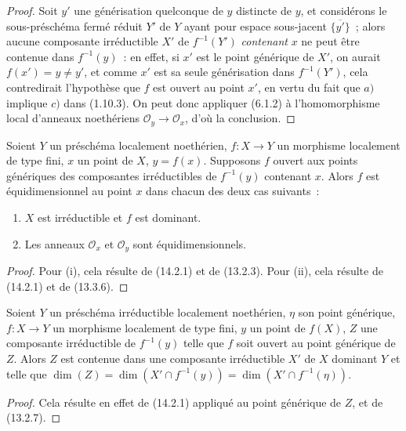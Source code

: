 \begin{proof}
Soit $y'$ une générisation quelconque de $y$ distincte de $y$, et considérons le
sous-préschéma fermé réduit $Y'$ de $Y$ ayant pour espace sous-jacent
$\overline{\{y'\}}$~; alors aucune composante irréductible $X'$ de $f^{-1}(Y')$
\emph{contenant} $x$ ne peut être contenue dans $f^{-1}(y)$~: en effet, si $x'$ est le
point générique de $X'$, on aurait $f(x')=y\ne y'$, et comme $x'$ est sa seule
générisation dans $f^{-1}(Y')$, cela contredirait l'hypothèse que $f$ est ouvert
au point $x'$, en vertu du fait que $a)$ implique $c)$ dans (1.10.3). On peut donc
appliquer (6.1.2) à l'homomorphisme local d'anneaux noethériens
$\mathcal O_y\to\mathcal O_x$, d'où la conclusion.
\end{proof}

\begin{corollary}[14.2.2]
\label{IV.14.2.2-fr}
Soient $Y$ un préschéma localement noethérien, $f:X\to Y$ un morphisme localement
de type fini, $x$ un point de $X$, $y=f(x)$. Supposons $f$ ouvert aux points
génériques des composantes irréductibles de $f^{-1}(y)$ contenant $x$. Alors $f$
est équidimensionnel au point $x$ dans chacun des deux cas suivants~:
\begin{enumerate}[label=(\roman*)]
  \item $X$ est irréductible et $f$ est dominant.
  \item Les anneaux $\mathcal O_x$ et $\mathcal O_y$ sont équidimensionnels.
\end{enumerate}
\end{corollary}

\begin{proof}
Pour (i), cela résulte de (14.2.1) et de (13.2.3). Pour (ii), cela résulte de
(14.2.1) et de (13.3.6).
\end{proof}

\begin{proposition}[14.2.3]
\label{IV.14.2.3-fr}
Soient $Y$ un préschéma irréductible localement noethérien, $\eta$ son point
générique, $f:X\to Y$ un morphisme localement de type fini, $y$ un point de
$f(X)$, $Z$ une composante irréductible de $f^{-1}(y)$ telle que $f$ soit ouvert
au point générique de $Z$. Alors $Z$ est contenue dans une composante irréductible
$X'$ de $X$ dominant $Y$ et telle que
$\dim(Z)=\dim(X'\cap f^{-1}(y))=\dim(X'\cap f^{-1}(\eta))$.
\end{proposition}

\begin{proof}
Cela résulte en effet de (14.2.1) appliqué au point générique de $Z$, et de
(13.2.7).
\end{proof}

